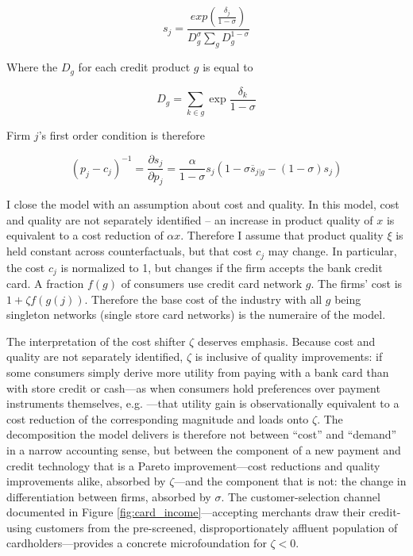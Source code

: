 \documentclass[12pt,english]{article}
\begin{document}
$$s_j = \frac{exp\left(\frac{\delta_j}{1-\sigma}\right)}{D_g^\sigma \sum_g D_g^{1-\sigma} }$$

Where the $D_g$ for each credit product $g$ is equal to 

$$D_g = \sum_{k \in g} \exp \frac{\delta_k}{1-\sigma}$$

Firm $j$'s first order condition is therefore

$$\left(p_j - c_j\right)^{-1} = \frac{\partial s_j}{\partial p_j} = \frac{\alpha}{1-\sigma}s_j\left(1-\sigma \overline{s}_{j|g}-\left(1-\sigma\right)s_j\right)$$

I close the model with an assumption about cost and quality. In this model, cost and quality are not separately identified -- an increase in product quality of $x$ is equivalent to a cost reduction of $\alpha x$. Therefore I assume that product quality $\xi$ is held constant across counterfactuals, but that cost $c_j$ may change. In particular, the cost $c_j$ is normalized to 1, but changes if the firm accepts the bank credit card. A fraction $f(g)$ of consumers use credit card network $g$. The firms' cost is $1+\zeta f(g(j))$. Therefore the base cost of the industry with all $g$ being singleton networks (single store card networks) is the numeraire of the model.

The interpretation of the cost shifter $\zeta$ deserves emphasis. Because cost and quality are not separately identified, $\zeta$ is inclusive of quality improvements: if some consumers simply derive more utility from paying with a bank card than with store credit or cash---as when consumers hold preferences over payment instruments themselves, e.g. \cite{wang_regulating_2023}---that utility gain is observationally equivalent to a cost reduction of the corresponding magnitude and loads onto $\zeta$. The decomposition the model delivers is therefore not between ``cost'' and ``demand'' in a narrow accounting sense, but between the component of a new payment and credit technology that is a Pareto improvement---cost reductions and quality improvements alike, absorbed by $\zeta$---and the component that is not: the change in differentiation between firms, absorbed by $\sigma$. The customer-selection channel documented in Figure \ref{fig:card_income}---accepting merchants draw their credit-using customers from the pre-screened, disproportionately affluent population of cardholders---provides a concrete microfoundation for $\zeta < 0$.
\end{document}
